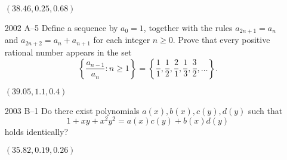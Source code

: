 \documentclass{article}
\begin{document}
\begin{itemize}
$(38.46,0.25,0.68)$
\item[2002 A--5]
Define a sequence by $a_0=1$, together with the rules
$a_{2n+1} = a_n$ and $a_{2n+2} = a_n + a_{n+1}$ for each
integer $n \geq 0$. Prove that every positive rational number
appears in the set
\[
\left\{ \frac{a_{n-1}}{a_n}: n \geq 1 \right\} =
\left\{ \frac{1}{1}, \frac{1}{2}, \frac{2}{1}, \frac{1}{3},
\frac{3}{2}, \dots \right\}.
\]


$(39.05,1.1,0.4)$
\item[2003 B--1]
Do there exist polynomials  $a(x), b(x), c(y), d(y)$  such that
\[
       1 + x y + x^2 y^2 = a(x) c(y) + b(x) d(y)
\]
holds identically?


$(35.82,0.19,0.26)$
\end{itemize}
\end{document}
